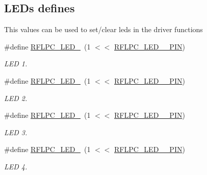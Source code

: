 \subsection*{L\-E\-Ds defines}
\label{_amgrp4a728e8ff27880d4b3cdf44336d0af9c}%
This values can be used to set/clear leds in the driver functions \begin{DoxyCompactItemize}
\item 
\hypertarget{group__leds_ga9591e0b54e0517952b7208d171abed30}{\#define \hyperlink{group__leds_ga9591e0b54e0517952b7208d171abed30}{R\-F\-L\-P\-C\-\_\-\-L\-E\-D\-\_}~(1 $<$$<$ \hyperlink{group__config_gaf2f44df1da41d405749c104714d685b3}{R\-F\-L\-P\-C\-\_\-\-L\-E\-D\-\_\-\_\-\-P\-I\-N})}\label{group__leds_ga9591e0b54e0517952b7208d171abed30}

\begin{DoxyCompactList}\small\item\em L\-E\-D 1. \end{DoxyCompactList}\item 
\hypertarget{group__leds_ga93854a9235b45e10365bb2371724e10b}{\#define \hyperlink{group__leds_ga93854a9235b45e10365bb2371724e10b}{R\-F\-L\-P\-C\-\_\-\-L\-E\-D\-\_}~(1 $<$$<$ \hyperlink{group__config_ga6faf6042aee47250aa8581072c96ef71}{R\-F\-L\-P\-C\-\_\-\-L\-E\-D\-\_\-\_\-\-P\-I\-N})}\label{group__leds_ga93854a9235b45e10365bb2371724e10b}

\begin{DoxyCompactList}\small\item\em L\-E\-D 2. \end{DoxyCompactList}\item 
\hypertarget{group__leds_gaefbc1285c098f1cca80f4746e7cf99e1}{\#define \hyperlink{group__leds_gaefbc1285c098f1cca80f4746e7cf99e1}{R\-F\-L\-P\-C\-\_\-\-L\-E\-D\-\_}~(1 $<$$<$ \hyperlink{group__config_ga81cffd6a00d32da136b5852b70bab8e6}{R\-F\-L\-P\-C\-\_\-\-L\-E\-D\-\_\-\_\-\-P\-I\-N})}\label{group__leds_gaefbc1285c098f1cca80f4746e7cf99e1}

\begin{DoxyCompactList}\small\item\em L\-E\-D 3. \end{DoxyCompactList}\item 
\hypertarget{group__leds_gabb50dad9b9dbebb24c6ed27f37357cb4}{\#define \hyperlink{group__leds_gabb50dad9b9dbebb24c6ed27f37357cb4}{R\-F\-L\-P\-C\-\_\-\-L\-E\-D\-\_}~(1 $<$$<$ \hyperlink{group__config_gaa2342a982cef2535071bfb723e6694e0}{R\-F\-L\-P\-C\-\_\-\-L\-E\-D\-\_\-\_\-\-P\-I\-N})}\label{group__leds_gabb50dad9b9dbebb24c6ed27f37357cb4}

\begin{DoxyCompactList}\small\item\em L\-E\-D 4. \end{DoxyCompactList}\end{DoxyCompactItemize}


